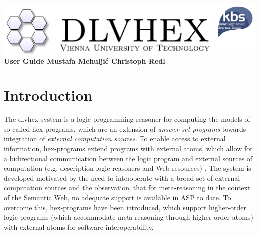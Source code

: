 \documentclass[14pt,a4paper, titlepage]{article}
\begin{document}
\setcounter{page}{3}
\newcommand{\dlvhex}{{\sc dlvhex}}
\newcommand{\hex}{{\sc hex}}
\setcounter{secnumdepth}{4} %
\setcounter{tocdepth}{4}    %

\newtheorem{exmp}{Example}[section]


\begin{titlepage}
    \centering
    \vfill
    \includegraphics[scale=1.2]{biglogo_whitebg}
    \vfill
    {\bfseries\Large
        User Guide
        \vskip4cm
        Mustafa Mehulji\'{c} \vskip1cm Christoph Redl
    }    
    
\end{titlepage}

\begin{abstract}
This document provides a user guide for the Answer Set 
Programming (ASP) system called \dlvhex{} developed at 
Vienna University of Technology. ASP is a declarative 
problem solving paradigm, rooted in logic programming and 
nonmonotonic reasoning, which has been gaining increasing 
attention during the last years. The \dlvhex{} system is a 
reasoner for computing the models of so-called \hex{}-programs, which are an extension of \emph{answer-set 
programs} towards integration of \emph{external computation 
sources}. This guide aims at enabling users of this system 
to interoperate with a broad set of external computation 
sources. The guide refers to release 2.4.     
\end{abstract}

\tableofcontents
\newpage

\section{Introduction} %
\label{sec:intro}
The \dlvhex{} system is a logic-programming reasoner for 
computing the models of so-called \hex{}-programs, which 
are an extension of \emph{answer-set programs} towards 
integration of \emph{external computation sources}. To 
enable access to external information, \hex{}-programs 
extend programs with external atoms, which allow for a 
bidirectional communication between the logic program and 
external sources of computation (e.g. description logic 
reasoners and Web resources) \cite{extatoms}. The system is 
developed motivated by the need to interoperate with a 
broad set of external computation sources and the 
observation, that for meta-reasoning in the context of the 
Semantic Web, no adequate support is available in ASP to 
date. To overcome this, \hex{}-programs have been 
introduced, which support higher-order logic programs 
(which accommodate meta-reasoning through higher-order 
atoms) with external atoms for software interoperability.
\end{document}

